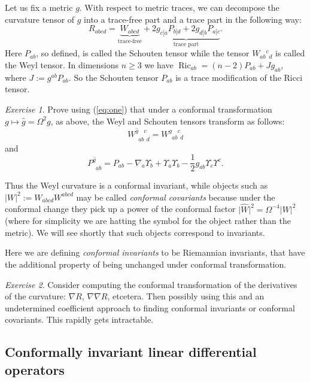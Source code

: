 \documentclass[a4paper,12pt]{amsart}
\theoremstyle{remark}
\newcommand{\nn}[1]{(\ref{#1})}
\newcommand{\Ric}{\operatorname{Ric}}
\newtheorem{exe}{Exercise}
\begin{document}
Let us fix a metric $g$. With respect to metric traces, we can
decompose the curvature tensor of $g$ into a trace-free part and a
trace part in the following way:
\begin{equation}\nonumber
R_{abcd}=\underbrace{W_{abcd}}_\textrm{trace-free}+\underbrace{2g_{c[a}P_{b]d}+2g_{d[b}P_{a]c}}_\textrm{trace part}.
\end{equation}
Here $P_{ab}$, so defined, is called the Schouten tensor while the tensor $W_{ab}{}^c{}_d$ is called the Weyl tensor.
In dimensions $n\geq 3$ we have 
$\Ric_{ab}=(n-2) P_{ab}+J g_{ab}$, where  $J:=g^{ab}P_{ab}$. So the Schouten 
tensor $P_{ab}$ is a trace modification of the  Ricci tensor.
\begin{exe}
Prove using \nn{eq:one} that under a conformal transformation 
$g\mapsto \widehat{g}=\Omega^2 g$, as above, the Weyl and Schouten tensors transform as follows:
\begin{equation}\nonumber
W^{\widehat{g}\phantom{ab}c}_{\phantom{\widehat{g}}ab\phantom{c}d}=
W^{g\phantom{ab}c}_{\phantom{g}ab\phantom{c}d}
\end{equation}
and
\begin{equation}\label{Ptrans}
P^{\widehat{g}}_{\phantom{\widehat{g}}ab}=P_{ab}-\nabla_a\Upsilon_b
+\Upsilon_a\Upsilon_b-\frac{1}{2}g_{ab}\Upsilon_c\Upsilon^c .
\end{equation}
\end{exe}
Thus the Weyl curvature is a conformal invariant, while objects such
as $\vert W \vert^2:=W_{abcd}W^{abcd}$ may be called
\textit{conformal covariants} 
because under the conformal change they
pick up a power of the conformal factor $\vert
\widehat{W}\vert^2=\Omega^{-4}\vert W\vert^2$ (where for simplicity we
are hatting the symbol for the object rather than the
metric). We will see shortly that such objects correspond to invariants.

Here we are defining {\em conformal invariants} to be Riemannian
invariants, that have the additional property of being unchanged under
conformal transformation.

\begin{exe}
Consider computing the conformal transformation of the derivatives
of the curvature: $\nabla R$, $\nabla \nabla R$, etcetera. Then
possibly using this and an undetermined coefficient approach to
finding conformal invariants or conformal covariants. This rapidly
gets intractable.
\end{exe}


\subsection{Conformally invariant linear differential operators} \label{cildos}
\end{document}
